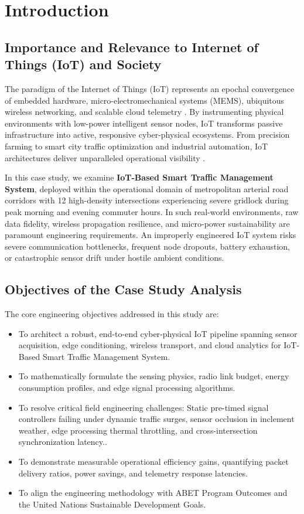 \section{Introduction}

\subsection{Importance and Relevance to Internet of Things (IoT) and Society}
The paradigm of the Internet of Things (IoT) represents an epochal convergence of embedded hardware, micro-electromechanical systems (MEMS), ubiquitous wireless networking, and scalable cloud telemetry \cite{al2015internet}. By instrumenting physical environments with low-power intelligent sensor nodes, IoT transforms passive infrastructure into active, responsive cyber-physical ecosystems. From precision farming to smart city traffic optimization and industrial automation, IoT architectures deliver unparalleled operational visibility \cite{zanella2014internet}.

In this case study, we examine \textbf{IoT-Based Smart Traffic Management System}, deployed within the operational domain of metropolitan arterial road corridors with 12 high-density intersections experiencing severe gridlock during peak morning and evening commuter hours. In such real-world environments, raw data fidelity, wireless propagation resilience, and micro-power sustainability are paramount engineering requirements. An improperly engineered IoT system risks severe communication bottlenecks, frequent node dropouts, battery exhaustion, or catastrophic sensor drift under hostile ambient conditions.

\subsection{Objectives of the Case Study Analysis}
The core engineering objectives addressed in this study are:
\begin{itemize}
  \item To architect a robust, end-to-end cyber-physical IoT pipeline spanning sensor acquisition, edge conditioning, wireless transport, and cloud analytics for IoT-Based Smart Traffic Management System.
  \item To mathematically formulate the sensing physics, radio link budget, energy consumption profiles, and edge signal processing algorithms.
  \item To resolve critical field engineering challenges: Static pre-timed signal controllers failing under dynamic traffic surges, sensor occlusion in inclement weather, edge processing thermal throttling, and cross-intersection synchronization latency..
  \item To demonstrate measurable operational efficiency gains, quantifying packet delivery ratios, power savings, and telemetry response latencies.
  \item To align the engineering methodology with ABET Program Outcomes and the United Nations Sustainable Development Goals.
\end{itemize}
